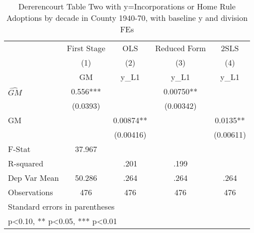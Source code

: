 \begin{table}[htbp]\centering
\def\sym#1{\ifmmode^{#1}\else\(^{#1}\)\fi}
\caption{Dererencourt Table Two with y=Incorporations or Home Rule Adoptions by decade in County 1940-70, with baseline y and division FEs}
\begin{tabular}{l*{4}{c}}
\toprule
                    & First Stage   &         OLS   &Reduced Form   &        2SLS   \\
                    &\multicolumn{1}{c}{(1)}&\multicolumn{1}{c}{(2)}&\multicolumn{1}{c}{(3)}&\multicolumn{1}{c}{(4)}\\
                    &\multicolumn{1}{c}{GM}&\multicolumn{1}{c}{y\_L1}&\multicolumn{1}{c}{y\_L1}&\multicolumn{1}{c}{y\_L1}\\
\midrule
$\hat{GM}$          &       0.556***&               &     0.00750** &               \\
                    &    (0.0393)   &               &   (0.00342)   &               \\
\addlinespace
GM                  &               &     0.00874** &               &      0.0135** \\
                    &               &   (0.00416)   &               &   (0.00611)   \\
\midrule
F-Stat              &      37.967   &               &               &               \\
R-squared           &               &        .201   &        .199   &               \\
Dep Var Mean        &      50.286   &        .264   &        .264   &        .264   \\
Observations        &         476   &         476   &         476   &         476   \\
\bottomrule
\multicolumn{5}{l}{\footnotesize Standard errors in parentheses}\\
\multicolumn{5}{l}{\footnotesize * p<0.10, ** p<0.05, *** p<0.01}\\
\end{tabular}
\end{table}
